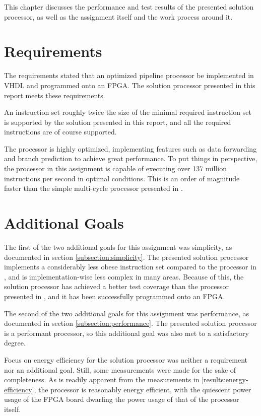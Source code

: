 This chapter discusses the performance and test results of the presented solution processor, as well as the assignment itself and the work process around it.

\section{Requirements}

The requirements stated that an optimized pipeline processor be implemented in VHDL and programmed onto an FPGA.
The solution processor presented in this report meets these requirements.

An instruction set roughly twice the size of the minimal required instruction set is supported by the solution presented in this report, and all the required instructions are of course supported.

The processor is highly optimized, implementing features such as data forwarding and branch prediction to achieve great performance.
To put things in perspective, the processor in this assignment is capable of executing over 137 million instructions per second in optimal conditions.
This is an order of magnitude faster than the simple multi-cycle processor presented in \cite{assignment-1}.

\section{Additional Goals}

The first of the two additional goals for this assignment was simplicity, as documented in section \vref{subsection:simplicity}.
The presented solution processor implements a considerably less obese instruction set compared to the processor in \cite{assignment-1}, and is implementation-wise less complex in many areas.
Because of this, the solution processor has achieved a better test coverage than the processor presented in \cite{assingment-1}, and it has been successfully programmed onto an FPGA.

The second of the two additional goals for this assignment was performance, as documented in section \vref{subsection:performance}.
The presented solution processor is a performant processor, so this additional goal was also met to a satisfactory degree.

Focus on energy efficiency for the solution processor was neither a requirement nor an additional goal.
Still, some measurements were made for the sake of completeness.
As is readily apparent from the measurements in \vref{results:energy-efficiency}, the processor is reasonably energy efficient, with the quiescent power usage of the FPGA board dwarfing the power usage of that of the processor itself.

